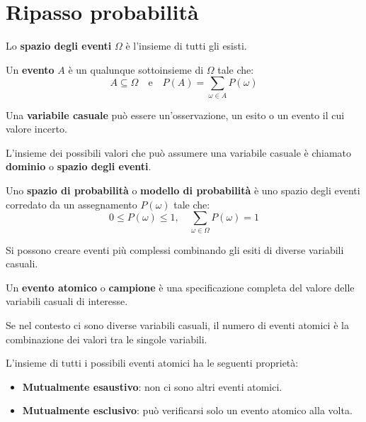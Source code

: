 \chapter{Ripasso probabilità}

\begin{definizione}
    Lo \textbf{spazio degli eventi} $\Omega$ è l'insieme di tutti gli esisti.
\end{definizione}
\begin{definizione}
    Un \textbf{evento} $A$ è un qualunque sottoinsieme di $\Omega$ tale che:
    \begin{equation*}
        A \subseteq \Omega \quad \text{e} \quad P(A) = \sum_{\omega \in A} P(\omega)
    \end{equation*}
\end{definizione}

\begin{definizione}
    Una \textbf{variabile casuale} può essere un'osservazione, un esito o un
    evento il cui valore incerto.
\end{definizione}
L'insieme dei possibili valori che può assumere una variabile casuale è chiamato
\textbf{dominio} o \textbf{spazio degli eventi}.
\begin{definizione}
    Uno \textbf{spazio di probabilità} o \textbf{modello di probabilità} è uno
    spazio degli eventi corredato da un assegnamento $P(\omega)$ tale che:
    \begin{equation*}
        0 \leq P(\omega) \leq 1, \quad \sum_{\omega \in \Omega} P(\omega) = 1
    \end{equation*}
\end{definizione}
Si possono creare eventi più complessi combinando gli esiti di diverse variabili
casuali.
\begin{definizione}
    Un \textbf{evento atomico} o \textbf{campione} è una specificazione completa
    del valore delle variabili casuali di interesse.
\end{definizione}
Se nel contesto ci sono diverse variabili casuali, il numero di eventi atomici
è la combinazione dei valori tra le singole variabili.

L'insieme di tutti i possibili eventi atomici ha le seguenti proprietà:
\begin{itemize}
    \item \textbf{Mutualmente esaustivo}: non ci sono altri eventi atomici.
    \item \textbf{Mutualmente esclusivo}: può verificarsi solo un evento atomico
          alla volta.
\end{itemize}

